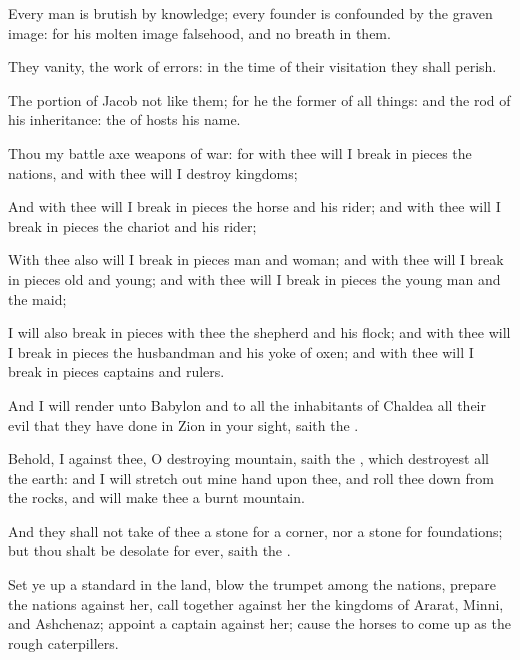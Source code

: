 {Every
man is
brutish by
{}
knowledge; every
founder is
confounded by the graven
image: for his molten
image
{}
falsehood, and
{} no
breath in them.

They
{}
vanity, the
work of
errors: in the
time of their
visitation they shall
perish.

The
portion of
Jacob
{} not like them; for he
{} the
former of all things: and
{} the
rod of his
inheritance: the
{} of
hosts
{} his
name.

Thou
{} my battle
axe
{}
weapons of
war: for with thee will I break in
pieces the
nations, and with thee will I
destroy
kingdoms;

And with thee will I break in
pieces the
horse and his
rider; and with thee will I break in
pieces the
chariot and his
rider;

With thee also will I break in
pieces
man and
woman; and with thee will I break in
pieces
old and
young; and with thee will I break in
pieces the young
man and the
maid;

I will also break in
pieces with thee the
shepherd and his
flock; and with thee will I break in
pieces the
husbandman and his yoke of
oxen; and with thee will I break in
pieces
captains and
rulers.

And I will
render unto
Babylon and to all the
inhabitants of
Chaldea all their
evil that they have
done in
Zion in your
sight,
saith the
{}.

Behold, I
{} against thee, O
destroying
mountain,
saith the
{}, which
destroyest all the
earth: and I will stretch
out mine
hand upon thee, and roll thee
down from the
rocks, and will
make thee a
burnt
mountain.

And they shall not
take of thee a
stone for a
corner, nor a
stone for
foundations; but thou shalt be
desolate for
ever,
saith the
{}.

Set ye
up a
standard in the
land,
blow the
trumpet among the
nations,
prepare the
nations against her, call
together against her the
kingdoms of
Ararat,
Minni, and
Ashchenaz;
appoint a
captain against her; cause the
horses to come
up as the
rough
caterpillers.

}
